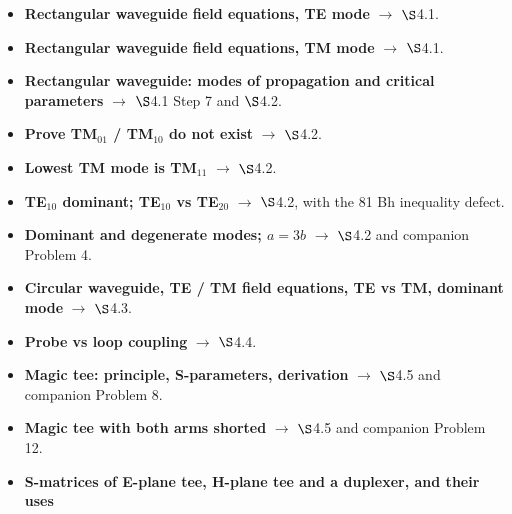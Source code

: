 \begin{itemize}
  \item \textbf{Rectangular waveguide field equations, TE mode} $\rightarrow$ $\S$4.1.
  \item \textbf{Rectangular waveguide field equations, TM mode} $\rightarrow$ $\S$4.1.
  \item \textbf{Rectangular waveguide: modes of propagation and critical parameters}
    $\rightarrow$ $\S$4.1 Step 7 and $\S$4.2. 
  \item \textbf{Prove TM$_{01}$ / TM$_{10}$ do not exist} $\rightarrow$ $\S$4.2. 
  \item \textbf{Lowest TM mode is TM$_{11}$} $\rightarrow$ $\S$4.2. 
  \item \textbf{TE$_{10}$ dominant; TE$_{10}$ vs TE$_{20}$} $\rightarrow$ $\S$4.2, with the
    81 Bh inequality defect. 
  \item \textbf{Dominant and degenerate modes; $a = 3b$} $\rightarrow$ $\S$4.2 and
    companion Problem 4. 
  \item \textbf{Circular waveguide, TE / TM field equations, TE vs TM, dominant mode}
    $\rightarrow$ $\S$4.3. 
  \item \textbf{Probe vs loop coupling} $\rightarrow$ $\S$4.4. 
  \item \textbf{Magic tee: principle, S-parameters, derivation} $\rightarrow$ $\S$4.5 and
    companion Problem 8. 
  \item \textbf{Magic tee with both arms shorted} $\rightarrow$ $\S$4.5 and companion
    Problem 12. \added{} 
  \item \textbf{S-matrices of E-plane tee, H-plane tee and a duplexer, and their uses}

\end{itemize}
